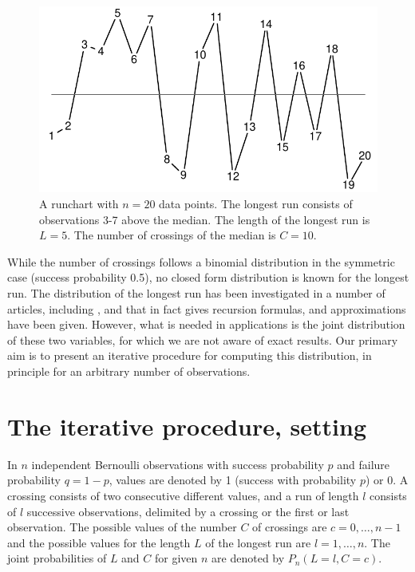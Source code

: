 \begin{figure}[htbp]
  \centering
  \caption{A runchart with $n=20$ data points. The longest run consists of observations 3-7 above the median. The length of the longest run is $L=5$. The number of crossings of the median is $C=10$.}
  \label{figure:fig1}
  \includegraphics{fig1}
\end{figure}

While the number of crossings follows a binomial distribution in the symmetric case (success probability 0.5), no closed form distribution is known for the longest run. The distribution of the longest run has been investigated in a number of articles, including \citep{Schilling:2012}, and \citep{Fazekas:2010} that in fact gives recursion formulas, and approximations have been given. However, what is needed in applications is the joint distribution of these two variables, for which we are not aware of exact results. Our primary aim is to present an iterative procedure for computing this distribution, in principle for an arbitrary number of observations.

\section{The iterative procedure, setting}

In $n$ independent Bernoulli observations with success probability $p$ and failure probability $q = 1 - p$, values are denoted by 1 (success with probability $p$) or 0. A crossing consists of two consecutive different values, and a run of length $l$ consists of $l$ successive observations, delimited by a crossing or the first or last observation. The possible values of the number $C$ of crossings are $c=0, \ldots ,n-1$ and the possible values for the length $L$ of the longest run are $l=1, \ldots ,n$. The joint probabilities of $L$ and $C$ for given $n$ are denoted by $P_n (L=l,C=c)$.

